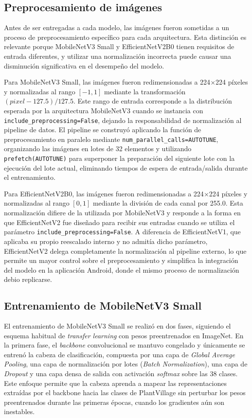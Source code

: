 \subsection{Preprocesamiento de imágenes}

Antes de ser entregadas a cada modelo, las imágenes fueron sometidas a un proceso de preprocesamiento específico para cada
arquitectura. Esta distinción es relevante porque MobileNetV3 Small y EfficientNetV2B0 tienen requisitos de entrada diferentes,
y utilizar una normalización incorrecta puede causar una disminución significativa en el desempeño del modelo.

Para MobileNetV3 Small, las imágenes fueron redimensionadas a 224$\times$224 píxeles y normalizadas al rango $[-1, 1]$
mediante la transformación $(pixel - 127.5) / 127.5$. Este rango de entrada corresponde a la distribución esperada por la
arquitectura MobileNetV3 cuando se instancia con \texttt{include\_preprocessing=False}, dejando la responsabilidad de
normalización al pipeline de datos. El pipeline se construyó aplicando la función de preprocesamiento en paralelo mediante
\texttt{num\_parallel\_calls=AUTOTUNE}, organizando las imágenes en lotes de 32 elementos y utilizando \texttt{prefetch(AUTOTUNE)}
para superponer la preparación del siguiente lote con la ejecución del lote actual, eliminando tiempos de espera de entrada/salida
durante el entrenamiento.

Para EfficientNetV2B0, las imágenes fueron redimensionadas a 224$\times$224 píxeles y normalizadas al rango $[0, 1]$ mediante
la división de cada canal por 255.0. Esta normalización difiere de la utilizada por MobileNetV3 y responde a la forma en que
EfficientNetV2 fue diseñado para recibir sus entradas cuando se utiliza el parámetro \texttt{include\_preprocessing=False}.
A diferencia de EfficientNetV1, que aplicaba su propio reescalado interno y no admitía dicho parámetro, EfficientNetV2 delega
completamente la normalización al pipeline externo, lo que permite un mayor control sobre el preprocesamiento y simplifica la
integración del modelo en la aplicación Android, donde el mismo proceso de normalización debio replicarse.


\subsection{Entrenamiento de MobileNetV3 Small}

El entrenamiento de MobileNetV3 Small se realizó en dos fases, siguiendo el esquema habitual de \textit{transfer learning}
con pesos preentrenados en ImageNet. En la primera fase, el \textit{backbone} convolucional se mantuvo congelado y únicamente
se entrenó la cabeza de clasificación, compuesta por una capa de \textit{Global Average Pooling}, una capa de normalización
por lotes (\textit{Batch Normalization}), una capa de \textit{Dropout} y una capa densa de salida con activación \textit{softmax}
sobre las 38 clases. Este enfoque permite que la cabeza aprenda a mapear las representaciones extraídas por el backbone hacia
las clases de PlantVillage sin perturbar los pesos preentrenados durante las primeras épocas, cuando los gradientes aún son
inestables.

